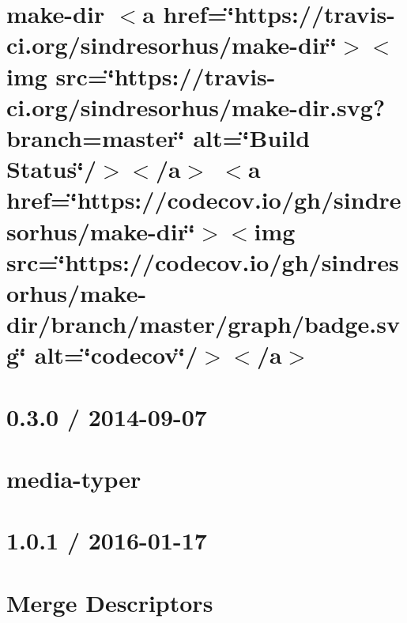 \let\mypdfximage\pdfximage\def\pdfximage{\immediate\mypdfximage}\documentclass[twoside]{book}
\newcommand{\+}{\discretionary{\mbox{\scriptsize$\hookleftarrow$}}{}{}}
\begin{document}
\chapter{make-\/dir $<$a href=\char`\"{}https\+://travis-\/ci.\+org/sindresorhus/make-\/dir\char`\"{}$>$$<$img src=\char`\"{}https\+://travis-\/ci.\+org/sindresorhus/make-\/dir.\+svg?branch=master\char`\"{} alt=\char`\"{}\+Build Status\char`\"{}/$>$$<$/a$>$ $<$a href=\char`\"{}https\+://codecov.\+io/gh/sindresorhus/make-\/dir\char`\"{}$>$$<$img src=\char`\"{}https\+://codecov.\+io/gh/sindresorhus/make-\/dir/branch/master/graph/badge.\+svg\char`\"{} alt=\char`\"{}codecov\char`\"{}/$>$$<$/a$>$}
\label{md__c_1__git_hub__p_r_o_y_e_c_t_o-_i_i_i-_g_o_t_rest-api_node_modules_make-dir_readme}

\chapter{0.3.0 / 2014-\/09-\/07}
\label{md__c_1__git_hub__p_r_o_y_e_c_t_o-_i_i_i-_g_o_t_rest-api_node_modules_media-typer__h_i_s_t_o_r_y}

\chapter{media-\/typer}
\label{md__c_1__git_hub__p_r_o_y_e_c_t_o-_i_i_i-_g_o_t_rest-api_node_modules_media-typer__r_e_a_d_m_e}

\chapter{1.0.1 / 2016-\/01-\/17}
\label{md__c_1__git_hub__p_r_o_y_e_c_t_o-_i_i_i-_g_o_t_rest-api_node_modules_merge-descriptors__h_i_s_t_o_r_y}

\chapter{Merge Descriptors}
\label{md__c_1__git_hub__p_r_o_y_e_c_t_o-_i_i_i-_g_o_t_rest-api_node_modules_merge-descriptors__r_e_a_d_m_e}

\end{document}
